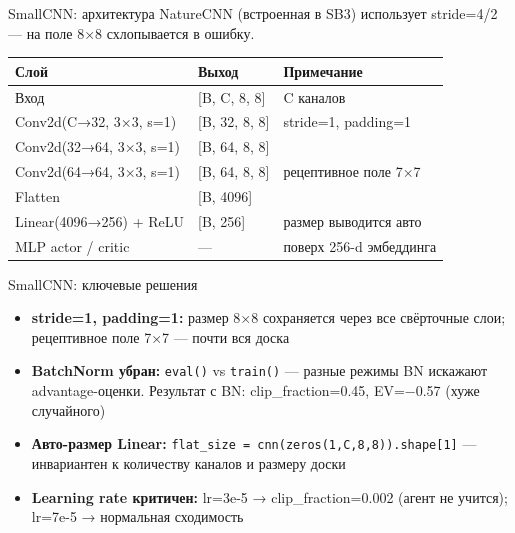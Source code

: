 \documentclass[aspectratio=169]{beamer}
\begin{document}
	\begin{frame}{SmallCNN: архитектура}
		NatureCNN (встроенная в SB3) использует stride=4/2 — на поле 8×8 схлопывается в ошибку.
		
		\bigskip
		\begin{center}
			\begin{tabular}{@{}lll@{}}
				\toprule
				\rowcolor{ThemeGridStroke}
				\color{ThemeCellFilled}Слой & \color{ThemeCellFilled}Выход & \color{ThemeCellFilled}Примечание \\
				\midrule
				Вход                     & [B, C, 8, 8]  & C каналов \\
				Conv2d(C→32, 3×3, s=1)   & [B, 32, 8, 8] & stride=1, padding=1 \\
				Conv2d(32→64, 3×3, s=1)  & [B, 64, 8, 8] & \\
				Conv2d(64→64, 3×3, s=1)  & [B, 64, 8, 8] & рецептивное поле 7×7 \\
				Flatten                  & [B, 4096]     & \\
				Linear(4096→256) + ReLU  & [B, 256]      & размер выводится авто \\
				MLP actor / critic       & —             & поверх 256-d эмбеддинга \\
				\bottomrule
			\end{tabular}
		\end{center}
	\end{frame}
	
	\begin{frame}{SmallCNN: ключевые решения}
		\begin{itemize}
			\item \textbf{stride=1, padding=1:} размер 8×8 сохраняется через все свёрточные слои; рецептивное поле 7×7 — почти вся доска
			
			\item \textbf{BatchNorm убран:} \texttt{eval()} vs \texttt{train()} — разные режимы BN искажают advantage-оценки.
			Результат с BN: clip\_fraction=0.45, EV=−0.57 (хуже случайного)
			
			\item \textbf{Авто-размер Linear:} \texttt{flat\_size = cnn(zeros(1,C,8,8)).shape[1]} — инвариантен к количеству каналов и размеру доски
			
			\item \textbf{Learning rate критичен:}
			lr=3e-5 → clip\_fraction=0.002 (агент не учится);
			lr=7e-5 → нормальная сходимость
		\end{itemize}
	\end{frame}
	
\end{document}
